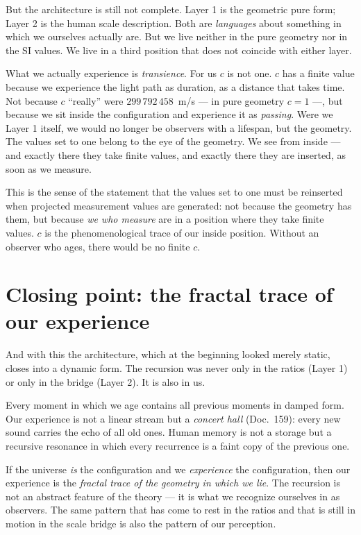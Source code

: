 But the architecture is still not complete. Layer 1 is the geometric
pure form; Layer 2 is the human scale description. Both are
\emph{languages} about something in which we ourselves actually are.
But we live neither in the pure geometry nor in the SI values. We
live in a third position that does not coincide with either layer.

What we actually experience is \emph{transience}. For us $c$ is not
one. $c$ has a finite value because we experience the light path as
duration, as a distance that takes time. Not because $c$ ``really''
were $299\,792\,458$~m/s --- in pure geometry $c = 1$ ---, but
because we sit inside the configuration and experience it as
\emph{passing}. Were we Layer 1 itself, we would no longer be
observers with a lifespan, but the geometry. The values set to one
belong to the eye of the geometry. We see from inside --- and
exactly there they take finite values, and exactly there they are
inserted, as soon as we measure.

This is the sense of the statement that the values set to one must be
reinserted when projected measurement values are generated: not
because the geometry has them, but because \emph{we who measure} are
in a position where they take finite values. $c$ is the
phenomenological trace of our inside position. Without an observer
who ages, there would be no finite $c$.

\section{Closing point: the fractal trace of our experience}

And with this the architecture, which at the beginning looked merely
static, closes into a dynamic form. The recursion was never only in
the ratios (Layer 1) or only in the bridge (Layer 2). It is also in us.

Every moment in which we age contains all previous moments in damped
form. Our experience is not a linear stream but a \emph{concert hall}
(Doc.~159): every new sound carries the echo of all old ones. Human
memory is not a storage but a recursive resonance in which every
recurrence is a faint copy of the previous one.

If the universe \emph{is} the configuration and we \emph{experience}
the configuration, then our experience is the \emph{fractal trace of
the geometry in which we lie}. The recursion is not an abstract
feature of the theory --- it is what we recognize ourselves in as
observers. The same pattern that has come to rest in the ratios and
that is still in motion in the scale bridge is also the pattern of
our perception.

